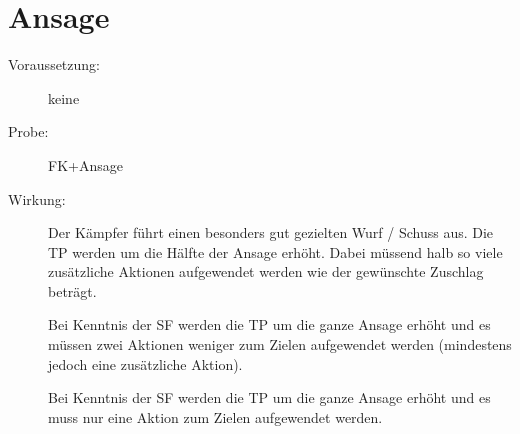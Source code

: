 \section{Ansage}
\label{fkM.ansage}
\begin{description}
    \item[Voraussetzung:]
        keine
    \item[Probe:]
        FK+Ansage
    \item[Wirkung:]
        Der Kämpfer führt einen besonders gut gezielten Wurf / Schuss aus.
        Die TP werden um die Hälfte der Ansage erhöht.
        Dabei müssend halb so viele zusätzliche Aktionen aufgewendet werden wie der gewünschte Zuschlag beträgt.

        Bei Kenntnis der SF  werden die TP um die ganze Ansage erhöht und es müssen zwei Aktionen weniger zum Zielen aufgewendet werden (mindestens jedoch eine zusätzliche Aktion).

        Bei Kenntnis der SF  werden die TP um die ganze Ansage erhöht und es muss nur eine Aktion zum Zielen aufgewendet werden.
\end{description}
